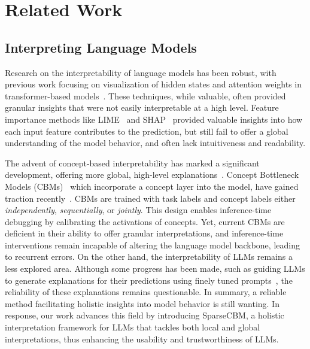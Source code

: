 \documentclass[letterpaper]{article} %
\begin{document}
\section{Related Work}
\subsection{Interpreting Language Models}
Research on the interpretability of language models has been robust, with previous work focusing on visualization of hidden states and attention weights in transformer-based models~\cite{vig2019multiscale,galassi2020attention}. These techniques, while valuable, often provided granular insights that were not easily interpretable at a high level. Feature importance methods like LIME~\cite{ribeiro2016should} and SHAP~\cite{lundberg2017unified} provided valuable insights into how each input feature contributes to the prediction, but still fail to offer a global understanding of the model behavior, and often lack intuitiveness and readability.

The advent of concept-based interpretability has marked a significant development, offering more global, high-level explanations~\cite{koh2020concept,abraham2022cebab,wang2023intepreting}. Concept Bottleneck Models (CBMs)~\citep{koh2020concept,oikarinenlabel} which incorporate a concept layer into the model, have gained traction recently~\cite{tan2023cbm}. CBMs are trained with task labels and concept labels either \textit{independently}, \textit{sequentially}, or \textit{jointly}. This design enables inference-time debugging by calibrating the activations of concepts. Yet, current CBMs are deficient in their ability to offer granular interpretations, and inference-time interventions remain incapable of altering the language model backbone, leading to recurrent errors. On the other hand, the interpretability of LLMs remains a less explored area. Although some progress has been made, such as guiding LLMs to generate explanations for their predictions using finely tuned prompts~\citep{li2022explanations}, the reliability of these explanations remains questionable. In summary, a reliable method facilitating holistic insights into model behavior is still wanting. In response, our work advances this field by introducing SparseCBM, a holistic interpretation framework for LLMs that tackles both local and global interpretations, thus enhancing the usability and trustworthiness of LLMs.
\end{document}
